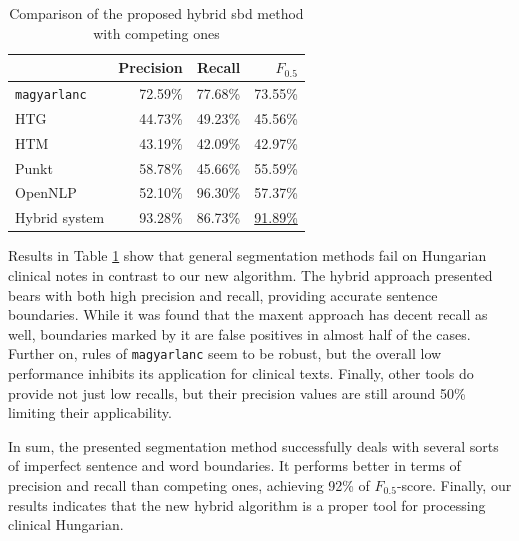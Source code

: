 \begin{table}[H]
\centering
\caption{Comparison of the proposed hybrid \acrshort{sbd} method with competing ones}
\label{tab:comparison}
\begin{tabular}{ l r r r} 
\hline
& Precision & Recall & $F_{0.5}$ \\
\hline
\texttt{magyarlanc} & 72.59\% & 77.68\% & 73.55\% \\
HTG & 44.73\% & 49.23\% & 45.56\% \\
HTM & 43.19\% & 42.09\% & 42.97\% \\
Punkt & 58.78\% & 45.66\% & 55.59\%  \\
OpenNLP & 52.10\% & 96.30\% & 57.37\% \\
Hybrid system & 93.28\% & 86.73\% & \underline{91.89\%} \\
\hline
\end{tabular}
\end{table}

Results in Table \ref{tab:comparison} show that general segmentation methods fail on Hungarian clinical notes in contrast to our new algorithm. 
The hybrid approach presented bears with both high precision and recall, providing accurate sentence boundaries.
While it was found that the \acrshort{maxent} approach has decent recall as well, boundaries marked by it are false positives in almost half of the cases. 
Further on, rules of \texttt{magyarlanc} seem to be robust, but the overall low performance inhibits its application for clinical texts. 
Finally, other tools do provide not just low recalls, but their precision values are still around 50\% limiting their applicability. 

In sum, the presented segmentation method successfully deals with several sorts of imperfect sentence and word boundaries.
It performs better in terms of precision and recall than competing ones, achieving 92\% of $F_{0.5}$-score. 
Finally, our results indicates that the new hybrid algorithm is a proper tool for processing clinical Hungarian.


